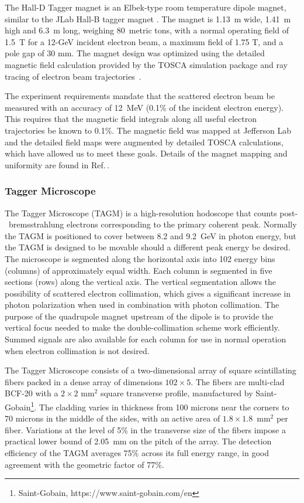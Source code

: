 The Hall-D Tagger magnet is an Elbek-type room temperature dipole magnet, similar
to the JLab Hall-B tagger magnet \cite{BORGGREEN19631, Sober2000263}. 
The magnet is 1.13~m wide, 1.41~m high and 6.3~m long, weighing 80~metric tons,
with a normal operating field of 1.5~T for a  12-GeV incident electron beam, 
a maximum field of 1.75 T, and a pole gap of 30 mm. 
The magnet
design was optimized using the detailed magnetic field calculation  provided by the
TOSCA simulation package and ray tracing of electron beam trajectories~\cite{DIPOLE_YANG,DIPOLE_SOMOV}.

The \gx{} experiment requirements mandate that the scattered
electron beam be measured with an accuracy of 12~MeV (0.1\% of the incident electron
energy). This requires that the magnetic field integrals along all useful electron
trajectories be known to 0.1\%. The magnetic field was mapped at Jefferson Lab and
the detailed field maps were augmented by detailed TOSCA calculations, which have
allowed us to meet these goals. Details of the magnet mapping and uniformity are
found in Ref.\,\cite{gx4271}.

\subsubsection{Tagger Microscope \label{sec:TAGM}}
The Tagger Microscope (TAGM) is a high-resolution hodoscope that counts post-~\!\!brems\-strah\-lung electrons corresponding to the primary coherent peak.
Normally the TAGM is positioned to cover between 8.2 and 9.2~GeV in photon energy, but the TAGM is designed to be movable should a different peak energy be desired.
The microscope is segmented along the horizontal axis into 102 energy bins (columns) of approximately equal width. Each column is segmented 
in five sections (rows) along the vertical axis. The vertical segmentation allows the possibility of scattered electron
collimation, which gives a significant increase in photon polarization when used in
combination with photon collimation. The purpose of the quadrupole magnet upstream
of the dipole is to provide the vertical focus needed to make the
double-collimation scheme work efficiently. Summed signals are also available for
each column for use in normal operation when electron collimation is not desired.

The Tagger Microscope consists of a two-dimensional array of square scintillating
fibers packed in a dense array of dimensions $102\times 5$. The fibers are multi-clad
BCF-20 with a $2\times 2$ mm$^2$ square transverse profile, manufactured by Saint-Gobain\footnote{Saint-Gobain, https://www.saint-gobain.com/en}.
The cladding varies in thickness from 100 microns near the corners to 70 microns in
the middle of the sides, with an active area of $1.8\times 1.8$~mm$^2$ per fiber.
Variations at the level of 5\% in the transverse size of the fibers impose a practical
lower bound of 2.05~mm on the pitch of the array. The detection efficiency of the TAGM
averages 75\% across its full energy range, in good agreement with the geometric
factor of 77\%.

